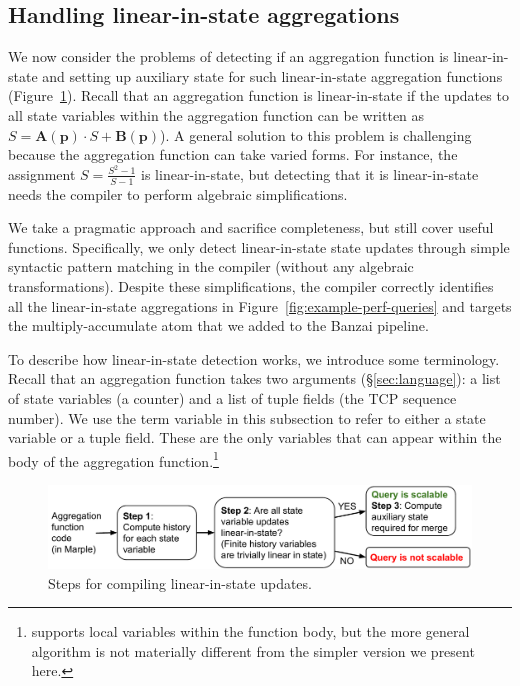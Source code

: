 \subsection{Handling linear-in-state aggregations}
\label{sec:linear-in-state-compilation}

We now consider the problems of detecting if an aggregation function is
linear-in-state and setting up auxiliary state for such linear-in-state
aggregation functions (Figure~\ref{fig:compiler-steps}). Recall that an
aggregation function is linear-in-state if the updates to all state variables
within the aggregation function can be written as $S =
\boldsymbol{A}(\mathbf{p}) \cdot S + \boldsymbol{B}(\mathbf{p})$).  A general
solution to this problem is challenging because the aggregation function can
take varied forms. For instance, the assignment $S = \frac{S^2 - 1}{S -1}$ is
linear-in-state, but detecting that it is linear-in-state needs the compiler to
perform algebraic simplifications.

We take a pragmatic approach and sacrifice completeness, but still cover useful
functions. Specifically, we only detect linear-in-state state updates through
simple syntactic pattern matching in the compiler (\ie without any algebraic
transformations).  Despite these simplifications, the \TheSystem compiler
correctly identifies all the linear-in-state aggregations in
Figure~\ref{fig:example-perf-queries} and targets the multiply-accumulate atom
that we added to the Banzai pipeline.

To describe how linear-in-state detection works, we introduce some terminology.
Recall that an aggregation function takes two arguments (\S\ref{sec:language}):
a list of state variables (\eg a counter) and a list of tuple fields (\eg the
TCP sequence number). We use the term variable in this subsection to refer to
either a state variable or a tuple field. These are the only variables that can
appear within the body of the aggregation function.\footnote{\TheSystem
supports local variables within the function body, but the more general
algorithm is not materially different from the simpler version we present
here.}

\begin{figure}
\centering
\includegraphics[width=\columnwidth]{pq_compiler-steps.pdf}
\caption{Steps for compiling linear-in-state updates.}
\label{fig:compiler-steps}
\end{figure}

